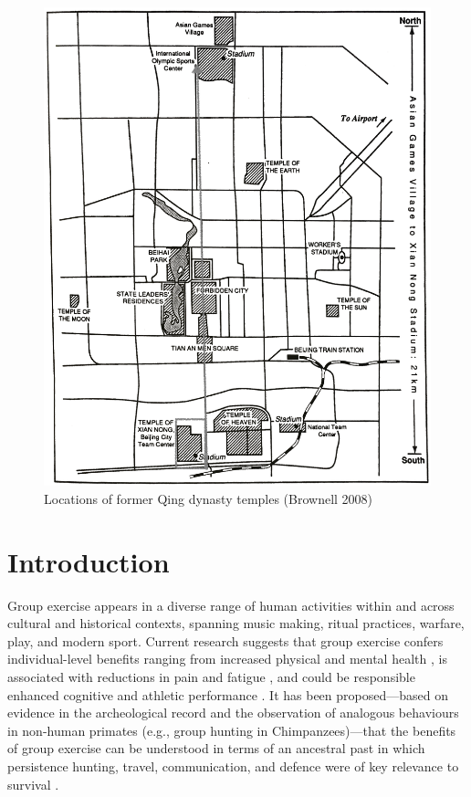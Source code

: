 \begin{figure}[htbp]
  \includegraphics[width = \linewidth]{images/beijingTemplesXNT.png}
  \caption{Locations of former Qing dynasty temples (Brownell 2008)}
  \label{fig:beijingTemplesXNT}
\end{figure}


\section{Introduction}
Group exercise appears in a diverse range of human activities within and across cultural and historical contexts, spanning music making, ritual practices, warfare, play, and modern sport.  Current research suggests that group exercise confers individual-level benefits ranging from increased physical and mental health \citep{}, is associated with reductions in pain and fatigue \citep{Cohen2009,Davis2018}, and could be responsible enhanced cognitive \citep{} and athletic \citep{Davis2015} performance . It has been proposed---based on evidence in the archeological record and the observation of analogous behaviours in non-human primates (e.g., group hunting in Chimpanzees)---that the benefits of group exercise can be understood in terms of an ancestral past in which persistence hunting, travel, communication, and defence were of key relevance to survival \citep{Sands2010}.

